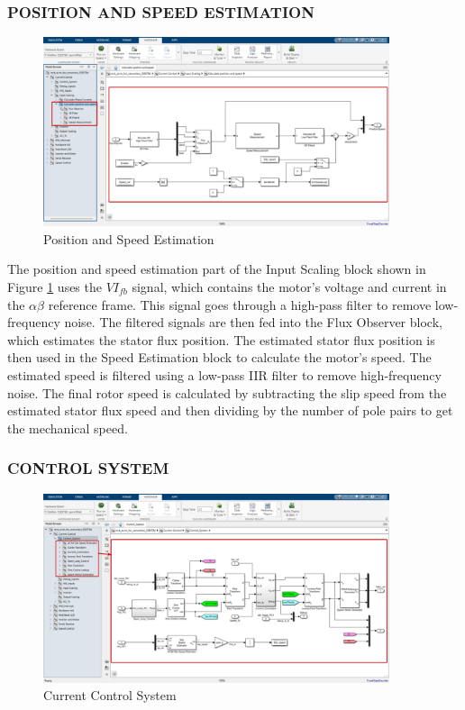 \subsubsection{POSITION AND SPEED ESTIMATION}



\begin{figure}[H]
	\centering
	\includegraphics[width=4in]{sections/section3/images/simulation/inputScaling/fluxObserver.png}
	\caption{Position and Speed Estimation}
	\label{fig:position_speed_estimation}
\end{figure}


The position and speed estimation part of the Input Scaling block shown in  Figure \ref{fig:position_speed_estimation} uses the $VI_{fb}$ signal, which contains the motor's voltage and current in the $\alpha \beta$ reference frame. This signal goes through a high-pass filter to remove low-frequency noise. The filtered signals are then fed into the Flux Observer block, which estimates the stator flux position. The estimated stator flux position is then used in the Speed Estimation block to calculate the motor's speed. The estimated speed is filtered using a low-pass IIR filter to remove high-frequency noise. The final rotor speed is calculated by subtracting the slip speed from the estimated stator flux speed and then dividing by the number of pole pairs to get the mechanical speed.

\subsubsection{CONTROL SYSTEM}



\begin{figure}[H]
	\centering
	\includegraphics[width=4in]{sections/section3/images/simulation/currentControl/controlSystem.png}
	\caption{Current Control System}
	\label{fig:current_control_system}
\end{figure}


